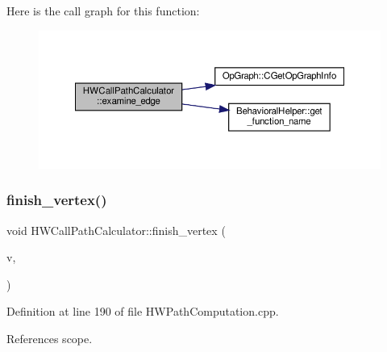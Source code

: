 Here is the call graph for this function\+:
\nopagebreak
\begin{figure}[H]
\begin{center}
\leavevmode
\includegraphics[width=350pt]{da/d67/classHWCallPathCalculator_a907a8d0f033b3d51c8499ffcd4070bc3_cgraph}
\end{center}
\end{figure}
\mbox{\label{classHWCallPathCalculator_ac39442469f65a16565954434a23a60c7}} 
\subsubsection{\texorpdfstring{finish\+\_\+vertex()}{finish\_vertex()}}
{\footnotesize\ttfamily void H\+W\+Call\+Path\+Calculator\+::finish\+\_\+vertex (\begin{DoxyParamCaption}\item[{const \hyperlink{UnfoldedCallGraph_8hpp_a6c87395c9d950d587c8e4db39b93e3e2}{Unfolded\+Vertex\+Descriptor} \&}]{v,  }\item[{const \hyperlink{classUnfoldedCallGraph}{Unfolded\+Call\+Graph} \&}]{ }\end{DoxyParamCaption})}



Definition at line 190 of file H\+W\+Path\+Computation.\+cpp.



References scope.

\mbox{\label{classHWCallPathCalculator_a995bb66a575708682644226f3d1e1ecf}} 
